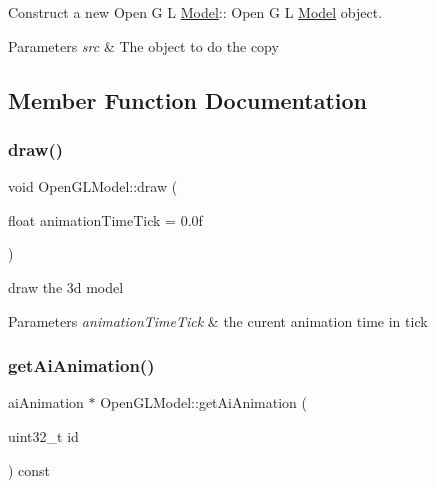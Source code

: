 Construct a new Open G L \hyperlink{class_model}{Model}\+:\+: Open G L \hyperlink{class_model}{Model} object. 


\begin{DoxyParams}{Parameters}
{\em src} & The object to do the copy \\
\hline
\end{DoxyParams}


\subsection{Member Function Documentation}
\mbox{\label{class_open_g_l_model_a4bd3e8f7769c665276083f0a2d038cba}} 
\subsubsection{\texorpdfstring{draw()}{draw()}}
{\footnotesize\ttfamily void Open\+G\+L\+Model\+::draw (\begin{DoxyParamCaption}\item[{float}]{animation\+Time\+Tick = {\ttfamily 0.0f} }\end{DoxyParamCaption})}



draw the 3d model 


\begin{DoxyParams}{Parameters}
{\em animation\+Time\+Tick} & the curent animation time in tick \\
\hline
\end{DoxyParams}
\mbox{\label{class_open_g_l_model_a48c2e9945d15e917388165bd5fc92dd8}} 
\subsubsection{\texorpdfstring{get\+Ai\+Animation()}{getAiAnimation()}}
{\footnotesize\ttfamily ai\+Animation $\ast$ Open\+G\+L\+Model\+::get\+Ai\+Animation (\begin{DoxyParamCaption}\item[{uint32\+\_\+t}]{id }\end{DoxyParamCaption}) const}



